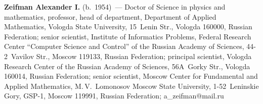 \vspace*{3pt}

\noindent
\textbf{Zeifman Alexander I.} (b.\ 1954)~--- Doctor of Science in physics and mathematics, professor, head of department,
Department
of Applied Mathematics,
Vologda State University, 15~Lenin Str., Vologda 160000, Russian Federation; senior scientist, Institute of
Informatics Problems, Federal Research Center ``Computer Science and Control'' of the Russian Academy of
Sciences, 44-2~Vavilov Str., Moscow 119133, Russian Federation; principal scientist, Vologda Research Center of
the Russian Academy of Sciences, 56A~Gorky Str., Vologda 160014, Russian Federation; senior scientist, Moscow
Center for Fundamental and Applied Mathematics, M.\,V.~Lomonosov Moscow State University, 1-52~Leninskie
Gory, GSP-1, Moscow 119991, Russian Federation; \mbox{a\_zeifman@mail.ru}




\label{end\stat}

\renewcommand{\bibname}{\protect\rm Литература} 